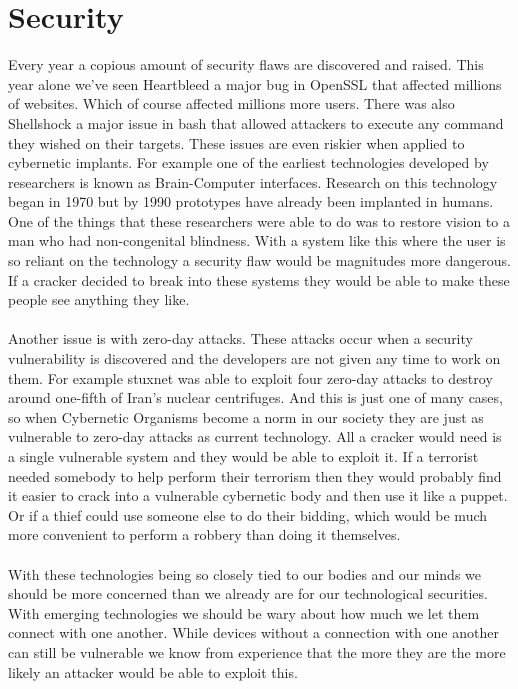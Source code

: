 \documentclass[12pt,a4paper,notitlepage]{article}
\begin{document}
\section{Security}
Every year a copious amount of security flaws are discovered and raised. This
year alone we've seen Heartbleed\cite{Heartbleed} a major bug in OpenSSL that
affected millions of websites. Which of course affected millions more users.
There was also Shellshock\cite{Shellshock} a major issue in bash that allowed
attackers to execute any command they wished on their targets. These issues are
even riskier when applied to cybernetic implants. For example one of the
earliest technologies developed by researchers is known as Brain-Computer
interfaces. Research on this technology began in 1970 but by 1990 prototypes
have already been implanted in humans. One of the things that these researchers
were able to do was to restore vision to a man who had non-congenital
blindness\cite{sight}. With a system like this where the user is so reliant on
the technology a security flaw would be magnitudes more dangerous. If a cracker
decided to break into these systems they would be able to make these people see
anything they like.
\\\\
Another issue is with zero-day attacks. These attacks occur when a security
vulnerability is discovered and the developers are not given any time to work on
them. For example stuxnet\cite{0day} was able to exploit four zero-day attacks
to destroy around one-fifth of Iran's nuclear centrifuges. And this is just one
of many cases, so when Cybernetic Organisms become a norm in our society they
are just as vulnerable to zero-day attacks as current technology. All a cracker
would need is a single vulnerable system and they would be able to exploit it.
If a terrorist needed somebody to help perform their terrorism then they would
probably find it easier to crack into a vulnerable cybernetic body and then use
it like a puppet. Or if a thief could use someone else to do their bidding,
which would be much more convenient to perform a robbery than doing it
themselves.
\\\\
With these technologies being so closely tied to our bodies and our minds we
should be more concerned than we already are for our technological securities.
With emerging technologies we should be wary about how much we let them connect
with one another. While devices without a connection with one another can still
be vulnerable we know from experience that the more they are the more likely an
attacker would be able to exploit this.
\end{document}
